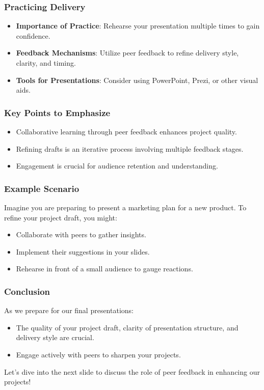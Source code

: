 \documentclass[aspectratio=169]{beamer}
\begin{document}
\begin{frame}[fragile]
    \frametitle{Practicing Delivery}
    \begin{itemize}
        \item \textbf{Importance of Practice}: Rehearse your presentation multiple times to gain confidence.
        \item \textbf{Feedback Mechanisms}: Utilize peer feedback to refine delivery style, clarity, and timing.
        \item \textbf{Tools for Presentations}: Consider using PowerPoint, Prezi, or other visual aids.
    \end{itemize}
\end{frame}

\begin{frame}[fragile]
    \frametitle{Key Points to Emphasize}
    \begin{itemize}
        \item Collaborative learning through peer feedback enhances project quality.
        \item Refining drafts is an iterative process involving multiple feedback stages.
        \item Engagement is crucial for audience retention and understanding.
    \end{itemize}
\end{frame}

\begin{frame}[fragile]
    \frametitle{Example Scenario}
    Imagine you are preparing to present a marketing plan for a new product. To refine your project draft, you might:
    \begin{itemize}
        \item Collaborate with peers to gather insights.
        \item Implement their suggestions in your slides.
        \item Rehearse in front of a small audience to gauge reactions.
    \end{itemize}
\end{frame}

\begin{frame}[fragile]
    \frametitle{Conclusion}
    As we prepare for our final presentations:
    \begin{itemize}
        \item The quality of your project draft, clarity of presentation structure, and delivery style are crucial.
        \item Engage actively with peers to sharpen your projects.
    \end{itemize}
    Let's dive into the next slide to discuss the role of peer feedback in enhancing our projects!
\end{frame}
\end{document}
